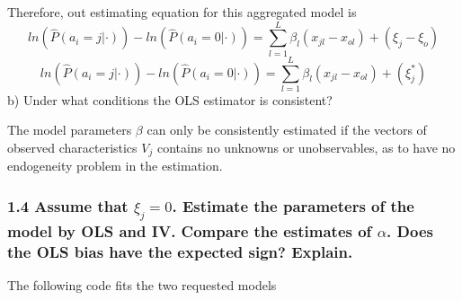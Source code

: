 \documentclass[
]{article}
\begin{document}
Therefore, out estimating equation for this aggregated model is \[
ln(\hat{P}(a_i=j|\cdot))-ln(\hat{P}(a_i=0|\cdot)) = \sum_{l=1}^{L}\beta_l (x_{jl}-x_{ol}) + (\xi_j-\xi_o)
\] \[
ln(\hat{P}(a_i=j|\cdot))-ln(\hat{P}(a_i=0|\cdot)) = \sum_{l=1}^{L}\beta_l (x_{jl}-x_{ol}) + (\xi_j^*)
\] b) Under what conditions the OLS estimator is consistent?

The model parameters \(\beta\) can only be consistently estimated if the
vectors of observed characteristics \(V_j\) contains no unknowns or
unobservables, as to have no endogeneity problem in the estimation.

\subsubsection{\texorpdfstring{1.4 Assume that \(\xi_j = 0\). Estimate
the parameters of the model by OLS and IV. Compare the estimates of
\(\alpha\). Does the OLS bias have the expected sign?
Explain.}{1.4 Assume that \textbackslash xi\_j = 0. Estimate the parameters of the model by OLS and IV. Compare the estimates of \textbackslash alpha. Does the OLS bias have the expected sign? Explain.}}\label{assume-that-xi_j-0.-estimate-the-parameters-of-the-model-by-ols-and-iv.-compare-the-estimates-of-alpha.-does-the-ols-bias-have-the-expected-sign-explain.}

The following code fits the two requested models
\end{document}

